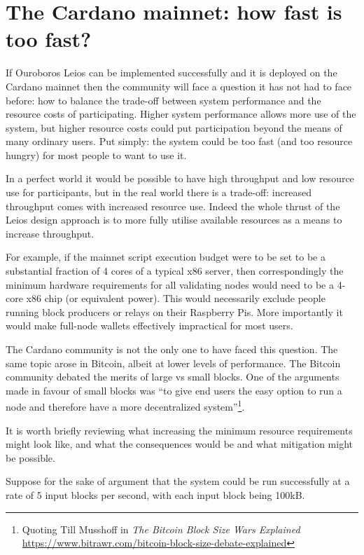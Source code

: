 \documentclass[11pt,a4paper]{article}
\begin{document}
\section{The Cardano mainnet: how fast is too fast?}
\label{sec:how-fast}

If Ouroboros Leios can be implemented successfully and it is deployed on the
Cardano mainnet then the community will face a question it has not had to face
before: how to balance the trade-off between system performance and the
resource costs of participating. Higher system performance allows more use of
the system, but higher resource costs could put participation beyond the means
of many ordinary users. Put simply: the system could be too fast (and too
resource hungry) for most people to want to use it.

In a perfect world it would be possible to have high throughput and low
resource use for participants, but in the real world there is a trade-off:
increased throughput comes with increased resource use. Indeed the whole thrust
of the Leios design approach is to more fully utilise available resources as a
means to increase throughput.

For example, if the mainnet script execution budget were to be set to be a
substantial fraction of 4 cores of a typical x86 server, then correspondingly
the minimum hardware requirements for all validating nodes would need to be a
4-core x86 chip (or equivalent power). This would necessarily exclude people
running block producers or relays on their Raspberry Pis. More importantly it
would make full-node wallets effectively impractical for most users.

The Cardano community is not the only one to have faced this question. The same
topic arose in Bitcoin, albeit at lower levels of performance. The Bitcoin
community debated the merits of large vs small blocks. One of the arguments
made in favour of small blocks was ``to give end users the easy option to run a
node and therefore have a more decentralized system''\footnote{Quoting Till
Musshoff in \emph{The Bitcoin Block Size Wars Explained} \\
\url{https://www.bitrawr.com/bitcoin-block-size-debate-explained}}.

It is worth briefly reviewing what increasing the minimum resource requirements
might look like, and what the consequences would be and what mitigation might
be possible.

Suppose for the sake of argument that the system could be run successfully
at a rate of 5 input blocks per second, with each input block being 100kB.
\end{document}
